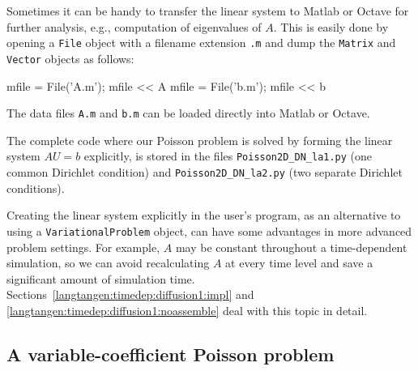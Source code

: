 Sometimes it can be handy to transfer the linear system to Matlab or Octave
for further analysis, e.g., computation of eigenvalues of $A$.
This is easily done by opening
a {\fontsize{10pt}{10pt}\texttt{File}} object with a filename extension {\fontsize{10pt}{10pt}\texttt{.m}} and dump
the {\fontsize{10pt}{10pt}\texttt{Matrix}} and {\fontsize{10pt}{10pt}\texttt{Vector}} objects as follows:
\begin{python}
mfile = File('A.m'); mfile << A
mfile = File('b.m'); mfile << b
\end{python}
The data files {\fontsize{10pt}{10pt}\texttt{A.m}} and {\fontsize{10pt}{10pt}\texttt{b.m}} can be loaded directly into
Matlab or Octave.

The complete code where our Poisson problem is solved by forming
the linear system $AU=b$ explicitly, is stored in the files
{\fontsize{10pt}{10pt}\verb!Poisson2D_DN_la1.py!} (one common Dirichlet condition) and
{\fontsize{10pt}{10pt}\verb!Poisson2D_DN_la2.py!} (two separate Dirichlet conditions).

Creating the linear system
explicitly in the user's program, as an alternative to
using a {\fontsize{10pt}{10pt}\texttt{VariationalProblem}} object, can have some advantages in more
advanced problem settings. For example, $A$ may be constant throughout
a time-dependent simulation, so we can avoid recalculating $A$ at
every time level and save a significant amount of simulation time. 
Sections~\ref{langtangen:timedep:diffusion1:impl} and
\ref{langtangen:timedep:diffusion1:noassemble} deal with this topic in detail.



\subsection{A variable-coefficient Poisson problem}
\label{langtangen:possion:2D:varcoeff}

